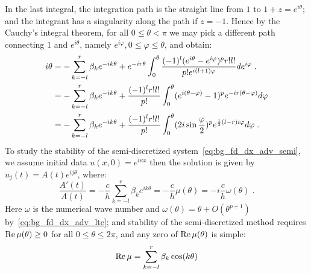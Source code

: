In the last integral, the integration path is the straight line from $1$ to $1+z=e^{i\theta}$; and the integrant has a singularity along the path if $z=-1$.
Hence by the Cauchy's integral theorem, for all $0\le\theta<\pi$ we may pick a different path connecting $1$ and $e^{i\theta}$, namely $e^{i\varphi}, 0\le\varphi\le\theta$, and obtain:
\begin{align}
  \notag
  i\theta &= -\sum_{k=-l}^r\beta_ke^{-ik\theta}+e^{-ir\theta}\int_0^{\theta}\frac{(-1)^l(e^{i\theta}-e^{i\varphi})^pr!l!}{p!e^{i(l+1)\varphi}}de^{i\varphi}\;. \\
  \notag
  &= -\sum_{k=-l}^r\beta_ke^{-ik\theta}+\frac{(-1)^lr!l!}{p!}\int_0^{\theta}(e^{i(\theta-\varphi)}-1)^pe^{-ir(\theta-\varphi)}d\varphi \\
  \label{eq:bg_fd_dx_adv_semi_symbol}
  &= -\sum_{k=-l}^r\beta_ke^{-ik\theta}+\frac{(-1)^lr!l!}{p!}\int_0^{\theta}(2i\sin\frac{\varphi}{2})^pe^{\frac{1}{2}(l-r)i\varphi}d\varphi\;.
\end{align}
To study the stability of the semi-discretized system~\cref{eq:bg_fd_dx_adv_semi}, we assume initial data $u(x,0)=e^{i\kappa x}$ then the solution is given by $u_j(t)=A(t)e^{ij\theta}$, where:
\begin{displaymath}
  \frac{A'(t)}{A(t)} = -\frac{c}{h}\sum_{k=-l}^r\beta_ke^{ik\theta} = -\frac{c}{h}\mu(\theta) = -i\frac{c}{h}\omega(\theta)\;.
\end{displaymath}
Here $\omega$ is the numerical wave number and $\omega(\theta)=\theta+O(\theta^{p+1})$ by~\cref{eq:bg_fd_dx_adv_lte}; and stability of the semi-discretized method requires $\operatorname{Re}\mu(\theta)\ge 0$ for all $0\le \theta\le 2\pi$, and any zero of $\operatorname{Re}\mu(\theta)$ is simple:
\begin{equation}\label{eq:bg_fd_dx_adv_re}
  \operatorname{Re}\mu = \sum_{k=-l}^r\beta_k\cos(k\theta)
\end{equation}

